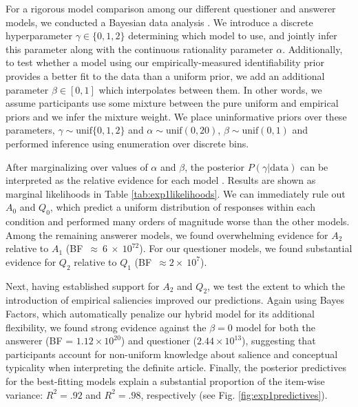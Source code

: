 \documentclass[11pt, floatsintext]{apa6}
\begin{document}
For a rigorous model comparison among our different questioner and answerer models, we conducted a Bayesian data analysis \cite{LeeWagenmakers14_BDA}. 
We introduce a discrete hyperparameter $\gamma \in \{0, 1, 2\}$  determining which model to use, and jointly infer this parameter along with the continuous rationality parameter $\alpha$.
Additionally, to test whether a model using our empirically-measured identifiability prior provides a better fit to the data than a uniform prior, we add an additional parameter $\beta \in [0,1]$ which interpolates between them.
In other words, we assume participants use some mixture between the pure uniform and empirical priors and we infer the mixture weight.
We place uninformative priors over these parameters,
$\gamma \sim  \textrm{unif}\{0, 1, 2\}$ and 
$\alpha   \sim  \textrm{unif}(0,20)$, 
$\beta \sim \textrm{unif}(0, 1)$
and performed inference using enumeration over discrete bins. 

After marginalizing over values of $\alpha$ and $\beta$, the posterior $P(\gamma | \textrm{data})$ can be interpreted as the relative evidence for each model \cite{KruschkeVanPaemel15_OxfordHandbook}.
Results are shown as marginal likelihoods in Table \ref{tab:exp1likelihoods}. 
We can immediately rule out $A_0$ and $Q_0$, which predict a uniform distribution of responses within each condition and performed many orders of magnitude worse than the other models.
Among the remaining answerer models, we found overwhelming evidence for $A_2$ relative to $A_1$ (BF~$\approx~6~\times~10^{72}$). 
For our questioner models, we found substantial evidence for $Q_2$ relative to $Q_1$ (BF~$\approx2\times~10^{7}$). 

Next, having established support for $A_2$ and $Q_2$, we test the extent to which the introduction of empirical saliencies improved our predictions. 
Again using Bayes Factors, which automatically penalize our hybrid model for its additional flexibility, we found strong evidence against the $\beta=0$ model for both the answerer (BF = $1.12\times 10^{20}$) and questioner ($2.44 \times 10^{13}$), suggesting that participants account for non-uniform knowledge about salience and conceptual typicality when interpreting the definite article.
Finally, the posterior predictives for the best-fitting models explain a substantial proportion of the item-wise variance: $R^2 = .92$ and $R^2 = .98$, respectively (see Fig. \ref{fig:exp1predictives}). 
\end{document}
